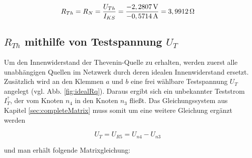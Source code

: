 \documentclass[11pt]{scrartcl}
\begin{document}
\begin{equation*}
  R_{Th} = R_N = \frac{U_{Th}}{I_{KS}} = \frac{-2,2807 \,\text{V}}{-0,5714 \,\text{A}} = 3,9912 \,\text{$\Omega$}
\end{equation*}

\subsection{$R_{Th}$ mithilfe von Testspannung $U_T$}

Um den Innenwiderstand der Thevenin-Quelle zu erhalten, werden zuerst alle unabhängigen Quellen im Netzwerk durch
deren idealen Innenwiderstand ersetzt. Zusätzlich wird an den Klemmen $a$ und $b$
eine frei wählbare Testspannung $U_T$ angelegt (vgl. Abb. \ref{fig:idealRq}).
Daraus ergibt sich ein unbekannter Teststrom $I_T^?$, der vom Knoten $n_4$ in den Knoten $n_3$ fließt.
Das Gleichungssystem aus Kapitel \ref{sec:completeMatrix} muss somit um eine weitere Gleichung ergänzt werden

\begin{equation*}
  U_T = U_{R5} = U_{n4} - U_{n3}
\end{equation*}

und man erhält folgende Matrixgleichung:
\end{document}
